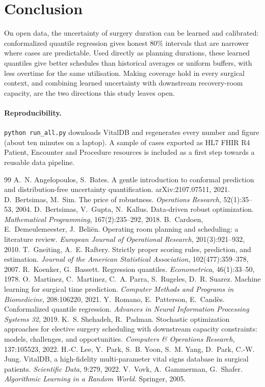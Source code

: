 \documentclass[11pt,a4paper]{article}
\begin{document}
\section{Conclusion}
On open data, the uncertainty of surgery duration can be learned and calibrated: conformalized quantile regression
gives honest 80\% intervals that are narrower where cases are predictable. Used directly as planning durations, these
learned quantiles give better schedules than historical averages or uniform buffers, with less overtime for the same
utilisation. Making coverage hold in every surgical context, and combining learned uncertainty with downstream
recovery-room capacity, are the two directions this study leaves open.

\paragraph{Reproducibility.} \texttt{python run\_all.py} downloads VitalDB and regenerates every number and figure
(about ten minutes on a laptop). A sample of cases exported as HL7 FHIR R4 Patient, Encounter and Procedure resources is
included as a first step towards a reusable data pipeline.

\begin{thebibliography}{99}\small
{} A.~N. Angelopoulos, S.~Bates. A gentle introduction to conformal prediction and
  distribution-free uncertainty quantification. arXiv:2107.07511, 2021.
 D.~Bertsimas, M.~Sim. The price of robustness. \emph{Operations Research}, 52(1):35--53, 2004.
 D.~Bertsimas, V.~Gupta, N.~Kallus. Data-driven robust optimization. \emph{Mathematical
  Programming}, 167(2):235--292, 2018.
 B.~Cardoen, E.~Demeulemeester, J.~Beliën. Operating room planning and scheduling: a literature
  review. \emph{European Journal of Operational Research}, 201(3):921--932, 2010.
 T.~Gneiting, A.~E. Raftery. Strictly proper scoring rules, prediction, and estimation.
  \emph{Journal of the American Statistical Association}, 102(477):359--378, 2007.
 R.~Koenker, G.~Bassett. Regression quantiles. \emph{Econometrica}, 46(1):33--50, 1978.
 O.~Martinez, C.~Martinez, C.~A. Parra, S.~Rugeles, D.~R. Suarez. Machine learning for surgical
  time prediction. \emph{Computer Methods and Programs in Biomedicine}, 208:106220, 2021.
 Y.~Romano, E.~Patterson, E.~Candès. Conformalized quantile regression. \emph{Advances in Neural
  Information Processing Systems 32}, 2019.
 K.~S. Shehadeh, R.~Padman. Stochastic optimization approaches for elective surgery scheduling
  with downstream capacity constraints: models, challenges, and opportunities. \emph{Computers \& Operations Research},
  137:105523, 2022.
 H.-C. Lee, Y.~Park, S.~B. Yoon, S.~M. Yang, D.~Park, C.-W. Jung. VitalDB, a high-fidelity
  multi-parameter vital signs database in surgical patients. \emph{Scientific Data}, 9:279, 2022.
 V.~Vovk, A.~Gammerman, G.~Shafer. \emph{Algorithmic Learning in a Random World}. Springer, 2005.
\end{thebibliography}
\end{document}
